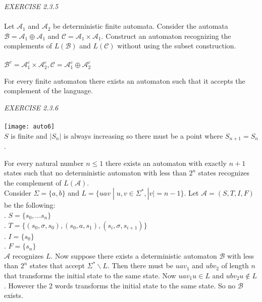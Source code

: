 \documentclass{article}
\begin{document}
\begin{siderules}\color{blue}\textit{EXERCISE 2.3.5}\color{black}\\\\
\color{blue} Let \(\mathcal{A}_{1}\) and \(\mathcal{A}_{2}\) be deterministic finite automata. Consider the 
automata \(\mathcal{B}=\mathcal{A}_{1}\oplus\mathcal{A}_{1}\) and \(\mathcal{C}=\mathcal{A}_{1}\times \mathcal{A}_{1}\). Construct an automaton recognizing the
complements of \(L(\mathcal{B})\) and \(L(\mathcal{C})\) without using the subset construction.\\\\\color{black}
\(\mathcal{B}^{c}=\mathcal{A}_{1}^{c}\times\mathcal{A}_{2}^{c},\mathcal{C}=\mathcal{A}_{1}^{c}\oplus\mathcal{A}_{2}^{c}\)
\end{siderules}
\color{red}For every finite automaton there exists an automaton such that it accepts the complement of the language.\color{black}
\begin{siderules}\color{blue}\textit{EXERCISE 2.3.6}\color{black}\\\\
    \texttt{[image: auto6]}\\
\(S\) is finite and \(|S_{n}|\) is always increasing so there must be a point where \(S_{n+1}=S_{n}\).
\end{siderules}
\color{red}For every natural number \(n\le 1\) there exists an automaton with exactly \(n+1\)
states such that no deterministic automaton with less than \(2^{n}\) states recognizes the complement of \(L(\mathcal{A})\).\\\color{black}
Consider \(\Sigma=\{a,b\}\) and \(L=\{uav\;|\;u,v\in\Sigma^{*},|v|=n-1\}\). Let \(\mathcal{A}=(S,T,I,F)\) be the following:\\
\null{}. \(S=\{s_{0},...s_{n}\}\)\\
\null{}. \(T=\{(s_{0},\sigma,s_{0}),(s_{0},a,s_{1}),(s_{i},\sigma,s_{i+1})\}\)\\
\null{}. \(I=\{s_{0}\}\)\\
\null{}. \(F=\{s_{n}\}\)\\
\(\mathcal{A}\) recognizes \(L\). Now suppose there exists a deterministic automaton \(\mathcal{B}\) with less than \(2^{n}\) states that accept \(\Sigma^{*}\backslash L\).
Then there must be \(uav_{1}\) and \(ubv_{2}\) of length \(n\) that transforms the initial state to the same state.
Now \(uav_{1}u\in L\) and \(ubv_{2}u\notin L\). However the 2 words transforms the initial state to the same state. So no \(\mathcal{B}\) exists.\\
\end{document}
